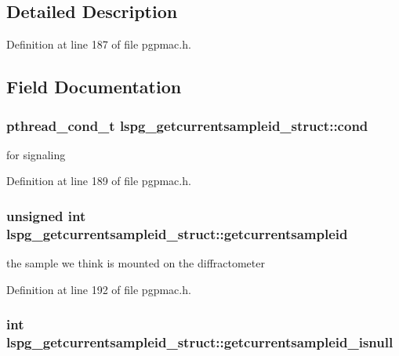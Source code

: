 \subsection{Detailed Description}


Definition at line 187 of file pgpmac.\-h.



\subsection{Field Documentation}
\hypertarget{structlspg__getcurrentsampleid__struct_a289960e45fdc9339a05dc8607f1b7563}{
\subsubsection[{cond}]{\setlength{\rightskip}{0pt plus 5cm}pthread\-\_\-cond\-\_\-t lspg\-\_\-getcurrentsampleid\-\_\-struct\-::cond}}\label{structlspg__getcurrentsampleid__struct_a289960e45fdc9339a05dc8607f1b7563}


for signaling 



Definition at line 189 of file pgpmac.\-h.

\hypertarget{structlspg__getcurrentsampleid__struct_af629de1e076fd6763bccea3547ef24e7}{
\subsubsection[{getcurrentsampleid}]{\setlength{\rightskip}{0pt plus 5cm}unsigned int lspg\-\_\-getcurrentsampleid\-\_\-struct\-::getcurrentsampleid}}\label{structlspg__getcurrentsampleid__struct_af629de1e076fd6763bccea3547ef24e7}


the sample we think is mounted on the diffractometer 



Definition at line 192 of file pgpmac.\-h.

\hypertarget{structlspg__getcurrentsampleid__struct_af370f8d1aaec7dd15121dc65d2a6cfc1}{
\subsubsection[{getcurrentsampleid\-\_\-isnull}]{\setlength{\rightskip}{0pt plus 5cm}int lspg\-\_\-getcurrentsampleid\-\_\-struct\-::getcurrentsampleid\-\_\-isnull}}\label{structlspg__getcurrentsampleid__struct_af370f8d1aaec7dd15121dc65d2a6cfc1}



